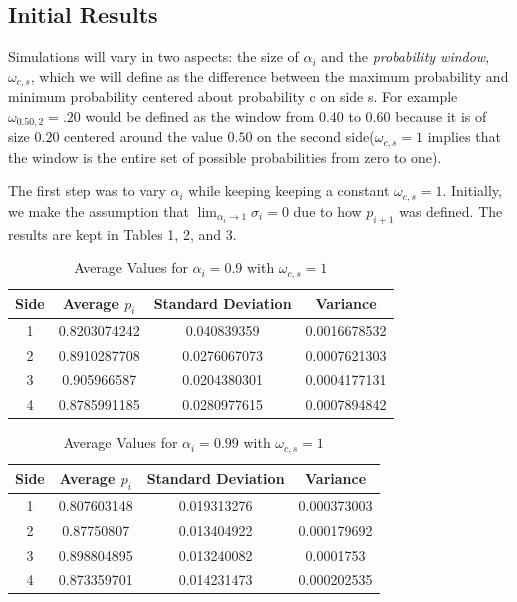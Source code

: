 \documentclass{article}
\begin{document}
\subsection{Initial Results}

Simulations will vary in two aspects:  the size of $\alpha_i$ and the \textit{probability window}, $\omega_{c,s}$, which we will define as the difference between the maximum probability and minimum probability centered about probability c on side s.  For example $\omega_{0.50,2} = .20$ would be defined as the window from $0.40$ to $0.60$ because it is of size $0.20$ centered around the value $0.50$ on the second side($\omega_{c,s} = 1$ implies that the window is the entire set of possible probabilities from zero to one).

The first step was to vary $\alpha_i$ while keeping keeping a constant $\omega_{c,s} = 1$.  Initially, we make the assumption that $\lim_{\alpha_i\rightarrow 1}\sigma_i = 0$ due to how $p_{i+1}$ was defined. The results are kept in Tables 1, 2, and 3.  

\begin{table}[h!]
\centering
\caption{Average Values for $\alpha_i = 0.9$ with $\omega_{c,s} = 1$}
\label{tab:table1}
\begin{tabular}{|c|c|c|c|}
\hline
Side & Average $p_i$ & Standard Deviation & Variance\\
\hline
1 & 0.8203074242 & 0.040839359 & 0.0016678532\\
2 & 0.8910287708 & 0.0276067073 & 0.0007621303\\
3 & 0.905966587 & 0.0204380301 & 0.0004177131\\
4 & 0.8785991185 & 0.0280977615 & 0.0007894842\\
\hline
\end{tabular}
\end{table}

\begin{table}[h!]
\centering
\caption{Average Values for $\alpha_i = 0.99$ with $\omega_{c,s} = 1$}
\label{tab:table1}
\begin{tabular}{|c|c|c|c|}
\hline
Side & Average $p_i$ & Standard Deviation & Variance\\
\hline
1 & 0.807603148 & 0.019313276 & 0.000373003\\
2 & 0.87750807 & 0.013404922 & 0.000179692\\
3 & 0.898804895 & 0.013240082 & 0.0001753\\
4 & 0.873359701 & 0.014231473 & 0.000202535\\
\hline
\end{tabular}
\end{table}
\end{document}
